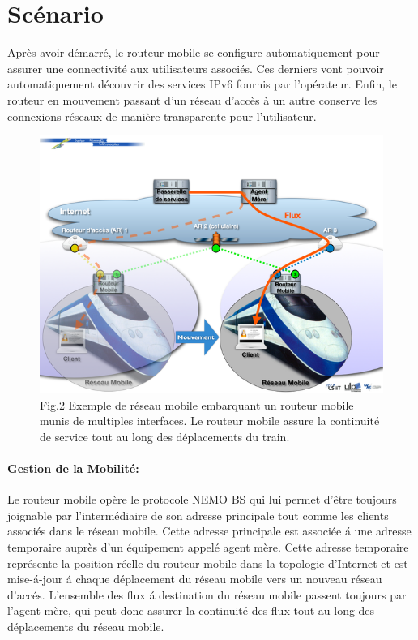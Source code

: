 \documentclass[12pt,a4paper]{report}
\begin{document}
\newpage
\section{Sc\'{e}nario}

Apr\`{e}s avoir d\'{e}marr\'{e}, le routeur mobile se configure automatiquement pour assurer une connectivit\'{e} aux utilisateurs associ\'{e}s. Ces derniers vont pouvoir automatiquement d\'{e}couvrir des services IPv6 fournis par l'op\'{e}rateur. Enfin, le routeur en mouvement passant d'un r\'{e}seau d'acc\`{e}s à un autre conserve les connexions r\'{e}seaux de mani\`{e}re transparente pour l'utilisateur.
\begin{figure}[h]
\begin{center}
\includegraphics[scale=0.7]{R2.png}
\caption[9pt]{Fig.2 Exemple de r\'{e}seau mobile embarquant un routeur mobile munis de multiples interfaces. Le routeur mobile assure la continuit\'{e} de service tout au long des d\'{e}placements du train.}
\end{center}
\end{figure}

\newpage
\paragraph{Gestion de la Mobilit\'{e}:} 
Le routeur mobile op\`{e}re le protocole NEMO BS qui lui permet d'\^{e}tre toujours joignable par l'interm\'{e}diaire de son adresse principale tout comme les clients associ\'{e}s dans le r\'{e}seau mobile. Cette adresse principale est associ\'{e}e \'{a} une adresse temporaire aupr\`{e}s d'un \'{e}quipement appel\'{e} agent m\`{e}re. Cette adresse temporaire repr\'{e}sente la position r\'{e}elle du routeur mobile dans la topologie d'Internet et est mise-\'{a}-jour \'{a} chaque d\'{e}placement du r\'{e}seau mobile vers un nouveau r\'{e}seau d'acc\'{e}s.
L'ensemble des flux \'{a} destination du r\'{e}seau mobile passent toujours par l'agent m\`{e}re, qui peut donc assurer la continuit\'{e} des flux tout au long des d\'{e}placements du r\'{e}seau mobile.
\end{document}
